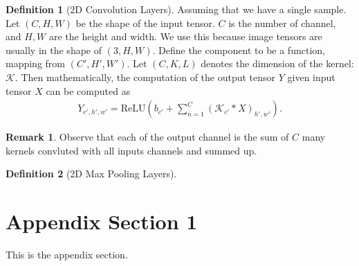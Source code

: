 \documentclass[]{article}
\theoremstyle{definition}
\newtheorem{definition}{Definition}
\newtheorem{remark}{Remark}[subsection]
{
    \newtheorem{assumption}{Assumption}
}
\numberwithin{equation}{subsection}
\begin{document}
        \begin{definition}[2D Convolution Layers]
            Assuming that we have a single sample. 
            Let $(C, H, W)$ be the shape of the input tensor. 
            $C$ is the number of channel, and $H, W$ are the height and width. 
            We use this because image tensors are usually in the shape of $(3, H, W)$. 
            Define the component to be a function, mapping from $(C', H', W')$. 
            Let $(C, K, L)$ denotes the dimension of the kernel: $\mathcal K$. 
            Then mathematically, the computation of the output tensor $Y$ given input tensor $X$ can be computed as
            $$
            \begin{aligned}
                Y_{c', h', w'} = 
                \text{ReLU}\left( b_{c'} + 
                \sum_{n = 1}^{C} (\mathcal K_{c'} * X)_{h', w'}\right). 
            \end{aligned}
            $$
        \end{definition}
        \begin{remark}
            Observe that each of the output channel is the sum of $C$ many kernels convluted with all inputs channels and summed up. 
            
        \end{remark}
        \begin{definition}[2D Max Pooling Layers]
            
        \end{definition}

        

\appendix
\section{Appendix Section 1}
    This is the appendix section. 





% 
\end{document}
